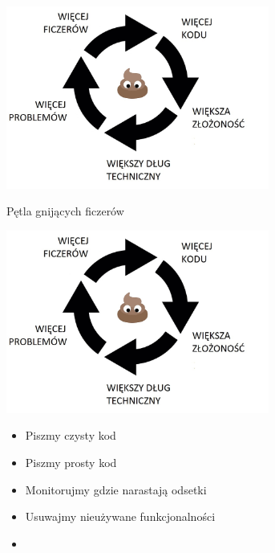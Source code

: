 \documentclass{beamer}
\begin{document}
\begin{frame}{}
\begin{center}
  	\includegraphics[height=6cm]{pgf7.jpg}
\end{center}
\end{frame}

\begin{frame}{Pętla gnijących ficzerów}
\begin{center}
  	\includegraphics[height=6cm]{pgf7.jpg}
\end{center}
\end{frame}

\begin{frame}{}
     \begin{Large}
	\begin{itemize}
		\item Piszmy czysty kod
		\item Piszmy prosty kod
		\item Monitorujmy gdzie narastają odsetki
		\item Usuwajmy nieużywane funkcjonalności
		\item 
	\end{itemize}
     \end{Large}
\end{frame}
\end{document}
